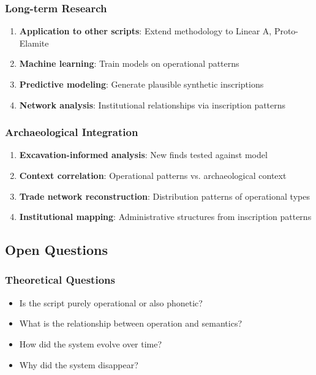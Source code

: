 \subsubsection{Long-term Research}
\begin{enumerate}
    \item \textbf{Application to other scripts}: Extend methodology to Linear A, Proto-Elamite
    \item \textbf{Machine learning}: Train models on operational patterns
    \item \textbf{Predictive modeling}: Generate plausible synthetic inscriptions
    \item \textbf{Network analysis}: Institutional relationships via inscription patterns
\end{enumerate}

\subsubsection{Archaeological Integration}
\begin{enumerate}
    \item \textbf{Excavation-informed analysis}: New finds tested against model
    \item \textbf{Context correlation}: Operational patterns vs. archaeological context
    \item \textbf{Trade network reconstruction}: Distribution patterns of operational types
    \item \textbf{Institutional mapping}: Administrative structures from inscription patterns
\end{enumerate}

\subsection{Open Questions}

\subsubsection{Theoretical Questions}
\begin{itemize}
    \item Is the script purely operational or also phonetic?
    \item What is the relationship between operation and semantics?
    \item How did the system evolve over time?
    \item Why did the system disappear?
\end{itemize}

